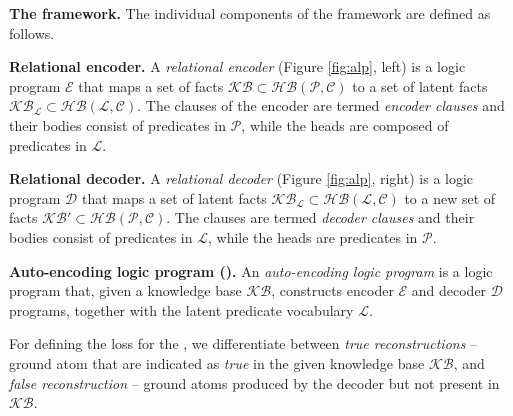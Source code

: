 \textbf{The framework.} 
The individual components of the framework are defined as follows.



\begin{definition}
\textbf{Relational encoder.} 
A \textit{relational encoder} (Figure \ref{fig:alp}, left) is a logic program $\mathcal{E}$ %
that maps a set of facts $\mathcal{KB} \subset \mathcal{HB(P,C)}$ to a set of latent facts $\mathcal{KB}_{\mathcal{L}} \subset \mathcal{HB(L,C)}$.
The clauses of the encoder are termed \textit{encoder clauses} and their bodies consist of predicates in $\mathcal{P}$, while the heads are composed of predicates in $\mathcal{L}$.
\end{definition}


\begin{definition}
\textbf{Relational decoder.} 
A \textit{relational decoder} (Figure \ref{fig:alp}, right) is a logic program $\mathcal{D}$ %
that maps a set of latent facts $\mathcal{KB}_{\mathcal{L}} \subset \mathcal{HB(L,C)}$  to a new set of facts $\mathcal{KB}' \subset \mathcal{HB(P,C)}$.
The clauses are termed \textit{decoder clauses} and their bodies consist of predicates in $\mathcal{L}$, while the heads are predicates in $\mathcal{P}$.
\end{definition}



\begin{definition}
\textbf{Auto-encoding logic program (\alp{}).} 
An \textit{auto-encoding logic program} is a logic program that, given a knowledge base $\mathcal{KB}$, constructs encoder $\mathcal{E}$ and decoder $\mathcal{D}$ programs, together with the latent predicate vocabulary $\mathcal{L}$. 
\end{definition}


For defining the loss for the , we differentiate between \textit{true reconstructions} -- ground atom that are indicated as \textit{true} in the given knowledge base $\mathcal{KB}$, and \textit{false reconstruction} -- ground atoms produced by the decoder but not present in $\mathcal{KB}$. 

